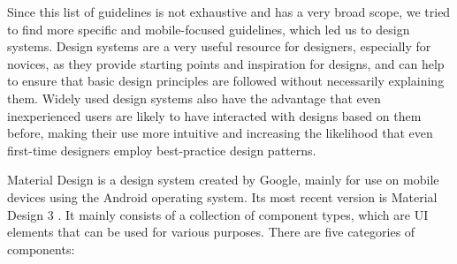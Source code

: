 \documentclass[11pt,titlepage,oneside,openany]{book}
\begin{document}
Since this list of guidelines is not exhaustive and has a very broad scope, we tried to find more specific and mobile-focused guidelines, which led us to design systems. Design systems are a very useful resource for designers, especially for novices, as they provide starting points and inspiration for designs, and can help to ensure that basic design principles are followed without necessarily explaining them. Widely used design systems also have the advantage that even inexperienced users are likely to have interacted with designs based on them before, making their use more intuitive and increasing the likelihood that even first-time designers employ best-practice design patterns.

Material Design is a design system created by Google, mainly for use on mobile devices using the Android operating system. Its most recent version is Material Design 3 \cite{noauthor_material_nodate}. It mainly consists of a collection of component types, which are UI elements that can be used for various purposes. There are five categories of components:
\end{document}
